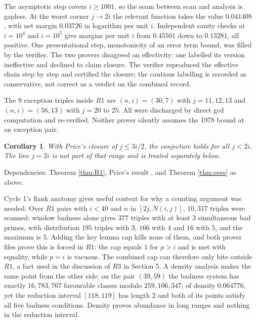 \documentclass[11pt]{article}
\newtheorem{corollary}[theorem]{Corollary}
\theoremstyle{remark}
\begin{document}
The asymptotic step covers $i\ge 1001$, so the seam between scan and analysis is gapless. At the worst corner $j\to 2i$ the relevant function takes the value $0.041408$, with net margin $0.03726$ in logarithm per unit $i$. Independent sanity checks at $i=10^4$ and $i=10^5$ give margins per unit $i$ from $0.45501$ down to $0.13281$, all positive. One presentational step, monotonicity of an error term bound, was filled by the verifier. The two provers disagreed on effectivity: one labelled its version ineffective and declined to claim closure. The verifier reproduced the effective chain step by step and certified the closure; the cautious labelling is recorded as conservative, not correct as a verdict on the combined record.

The $9$ exception triples inside $R1$ are $(n,i)=(30,7)$ with $j=11,12,13$ and $(n,i)=(56,13)$ with $j=20$ to $25$. All were discharged by direct gcd computation and re-verified. Neither prover silently assumes the 1978 bound at an exception pair.

\begin{corollary}
\label{cor:jlt2i}
With Price's closure of $j\le 3i/2$, the conjecture holds for all $j<2i$. The line $j=2i$ is not part of that range and is treated separately below.
\end{corollary}

Dependencies: Theorem \ref{thm:R1}, Price's result \cite{Price}, and Theorem \ref{thm:eees} as above.

Cycle 1's flank anatomy gives useful context for why a counting argument was needed. Over $R1$ pairs with $i<40$ and $n$ in $[2j,N(i,j)]$, $10{,}317$ triples were scanned: window badness alone gives $377$ triples with at least $3$ simultaneous bad primes, with distribution $195$ triples with $3$, $166$ with $4$ and $16$ with $5$, and the maximum is $5$. Adding the key lemma cap kills none of them, and both prover files prove this is forced in $R1$: the cap equals $1$ for $p>i$ and is met with equality, while $p=i$ is vacuous. The combined cap can therefore only bite outside $R1$, a fact used in the discussion of $R3$ in Section 5. A density analysis makes the same point from the other side: on the pair $(39,59)$ the badness system has exactly $16{,}783{,}767$ favourable classes modulo $259{,}106{,}347$, of density $0.064776$, yet the reduction interval $[118,119]$ has length $2$ and both of its points satisfy all five badness conditions. Density proves abundance in long ranges and nothing in the reduction interval.
\end{document}
